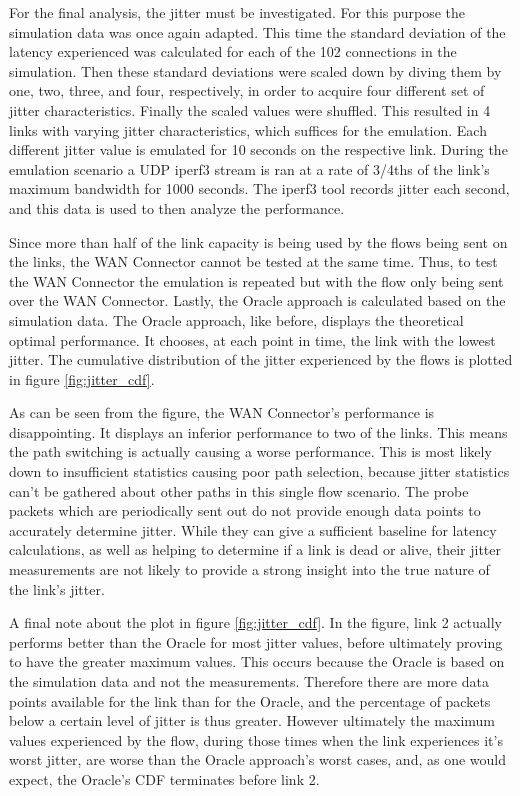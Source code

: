 For the final analysis, the jitter must be investigated. For this purpose the simulation data was once again adapted. This time the standard deviation of the latency experienced was calculated for each of the 102 connections in the simulation. Then these standard deviations were scaled down by diving them by one, two, three, and four, respectively, in order to acquire four different set of jitter characteristics. Finally the scaled values were shuffled. This resulted in 4 links with varying jitter characteristics, which suffices for the emulation. Each different jitter value is emulated for 10 seconds on the respective link. During the emulation scenario a UDP iperf3 stream is ran at a rate of 3/4ths of the link's maximum bandwidth for 1000 seconds. The iperf3 tool records jitter each second, and this data is used to then analyze the performance.

Since more than half of the link capacity is being used by the flows being sent on the links, the WAN Connector cannot be tested at the same time. Thus, to test the WAN Connector the emulation is repeated but with the flow only being sent over the WAN Connector. Lastly, the Oracle approach is calculated based on the simulation data. The Oracle approach, like before, displays the theoretical optimal performance. It chooses, at each point in time, the link with the lowest jitter. The cumulative distribution of the jitter experienced by the flows is plotted in figure \ref{fig:jitter_cdf}.

As can be seen from the figure, the WAN Connector's performance is disappointing. It displays an inferior performance to two of the links. This means the path switching is actually causing a worse performance. This is most likely down to insufficient statistics causing poor path selection, because jitter statistics can't be gathered about other paths in this single flow scenario. The probe packets which are periodically sent out do not provide enough data points to accurately determine jitter. While they can give a sufficient baseline for latency calculations, as well as helping to determine if a link is dead or alive, their jitter measurements are not likely to provide a strong insight into the true nature of the link's jitter.

A final note about the plot in figure \ref{fig:jitter_cdf}. In the figure, link 2 actually performs better than the Oracle for most jitter values, before ultimately proving to have the greater maximum values. This occurs because the Oracle is based on the simulation data and not the measurements. Therefore there are more data points available for the link than for the Oracle, and the percentage of packets below a certain level of jitter is thus greater. However ultimately the maximum values experienced by the flow, during those times when the link experiences it's worst jitter, are worse than the Oracle approach's worst cases, and, as one would expect, the Oracle's CDF terminates before link 2.


